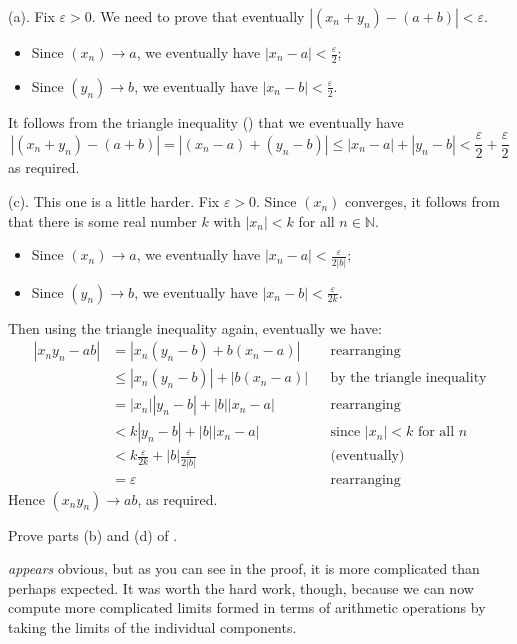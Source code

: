 \begin{cproof}[of {(a)} and {(c)}]
(a). Fix $\varepsilon > 0$. We need to prove that eventually $|(x_n+y_n)-(a+b)| < \varepsilon$.
\begin{itemize}
\item Since $(x_n) \to a$, we eventually have $|x_n-a| < \frac{\varepsilon}{2}$;
\item Since $(y_n) \to b$, we eventually have $|x_n-b| < \frac{\varepsilon}{2}$.
\end{itemize}
It follows from the triangle inequality () that we eventually have
\[ |(x_n+y_n) - (a+b)| = |(x_n-a) + (y_n-b)| \le |x_n-a| + |y_n-b| < \frac{\varepsilon}{2} + \frac{\varepsilon}{2} \]
as required.

(c). This one is a little harder. Fix $\varepsilon > 0$. Since $(x_n)$ converges, it follows from  that there is some real number $k$ with $|x_n| < k$ for all $n \in \mathbb{N}$.
\begin{itemize}
\item Since $(x_n) \to a$, we eventually have $|x_n-a| < \frac{\varepsilon}{2|b|}$;
\item Since $(y_n) \to b$, we eventually have $|x_n-b| < \frac{\varepsilon}{2k}$.
\end{itemize}
Then using the triangle inequality again, eventually we have:
\begin{align*}
|x_ny_n - ab| &= |x_n(y_n-b) + b(x_n-a)| && \text{rearranging} \\
&\le |x_n(y_n-b)| + |b(x_n-a)| && \text{by the triangle inequality} \\
&= |x_n| |y_n-b| + |b| |x_n-a| && \text{rearranging} \\
&< k|y_n-b| + |b| |x_n-a| && \text{since $|x_n| < k$ for all $n$} \\
&< k\frac{\varepsilon}{2k} + |b|\frac{\varepsilon}{2|b|} && \text{(eventually)} \\
&= \varepsilon && \text{rearranging}
\end{align*}
Hence $(x_ny_n) \to ab$, as required.
\end{cproof}

\begin{exercise}
Prove parts (b) and (d) of .
\end{exercise}

 \textit{appears} obvious, but as you can see in the proof, it is more complicated than perhaps expected. It was worth the hard work, though, because we can now compute more complicated limits formed in terms of arithmetic operations by taking the limits of the individual components.

